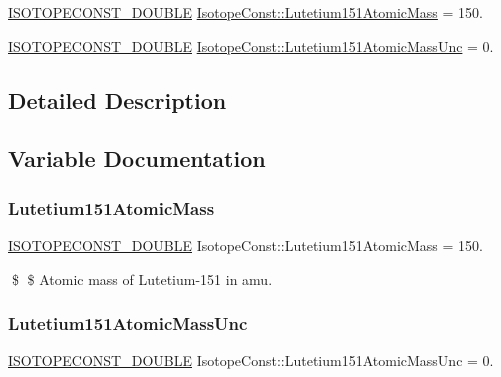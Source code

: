 \begin{DoxyCompactItemize}
\item 
\mbox{\hyperlink{group___isotope_const-_macros_ga8f45a7272ce02c0b4c65c44636ed719a}{I\+S\+O\+T\+O\+P\+E\+C\+O\+N\+S\+T\+\_\+\+D\+O\+U\+B\+LE}} \mbox{\hyperlink{group___isotope_const-_lutetium-_lu151_ga618e0fa30865a7b67ddde6dd3d5b8c4f}{Isotope\+Const\+::\+Lutetium151\+Atomic\+Mass}} = 150.
\item 
\mbox{\hyperlink{group___isotope_const-_macros_ga8f45a7272ce02c0b4c65c44636ed719a}{I\+S\+O\+T\+O\+P\+E\+C\+O\+N\+S\+T\+\_\+\+D\+O\+U\+B\+LE}} \mbox{\hyperlink{group___isotope_const-_lutetium-_lu151_ga7840025c8ddddbad3ccd6b737589832b}{Isotope\+Const\+::\+Lutetium151\+Atomic\+Mass\+Unc}} = 0.
\end{DoxyCompactItemize}


\subsection{Detailed Description}


\subsection{Variable Documentation}
\mbox{\label{group___isotope_const-_lutetium-_lu151_ga618e0fa30865a7b67ddde6dd3d5b8c4f}} 
\subsubsection{\texorpdfstring{Lutetium151\+Atomic\+Mass}{Lutetium151AtomicMass}}
{\footnotesize\ttfamily \mbox{\hyperlink{group___isotope_const-_macros_ga8f45a7272ce02c0b4c65c44636ed719a}{I\+S\+O\+T\+O\+P\+E\+C\+O\+N\+S\+T\+\_\+\+D\+O\+U\+B\+LE}} Isotope\+Const\+::\+Lutetium151\+Atomic\+Mass = 150.}

\$ \$ Atomic mass of Lutetium-\/151 in amu. \mbox{\label{group___isotope_const-_lutetium-_lu151_ga7840025c8ddddbad3ccd6b737589832b}} 
\subsubsection{\texorpdfstring{Lutetium151\+Atomic\+Mass\+Unc}{Lutetium151AtomicMassUnc}}
{\footnotesize\ttfamily \mbox{\hyperlink{group___isotope_const-_macros_ga8f45a7272ce02c0b4c65c44636ed719a}{I\+S\+O\+T\+O\+P\+E\+C\+O\+N\+S\+T\+\_\+\+D\+O\+U\+B\+LE}} Isotope\+Const\+::\+Lutetium151\+Atomic\+Mass\+Unc = 0.}

